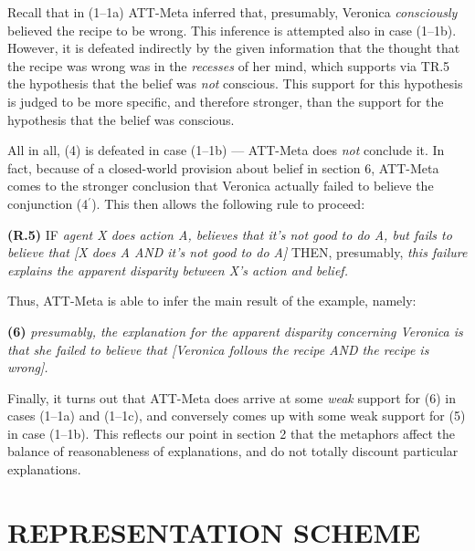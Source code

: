 Recall that in (1--1a) ATT-Meta inferred that, presumably, Veronica {\it
consciously} believed the recipe to be wrong. This inference is attempted also
in case (1--1b).  However, it is defeated indirectly by the given information
that the thought that the recipe was wrong was in the {\it recesses} of her
mind, which supports via TR.5 the hypothesis that the belief was {\it not}
conscious.  This support for this hypothesis is judged to be more specific, and
therefore stronger, than the support for the hypothesis that the belief was
conscious.

All in all, (4) is defeated in case (1--1b) --- ATT-Meta does {\it not}
conclude it.  In fact, because of a closed-world provision about belief in
section 6, ATT-Meta comes to the stronger conclusion that Veronica actually
failed to believe the conjunction (4$^\prime$).  This then allows the following
rule to proceed:

\addtolength{\baselineskip}{-.375\baselineskip}

{\bf (R.5)} IF {\it agent X does action A, believes that it's not 
good to do A, but fails to believe that [X does A AND it's not 
good to do A]} THEN, presumably, {\it this failure explains the apparent disparity
between X's action and belief.}

Thus, ATT-Meta is able to infer the main result of the example, namely:

{\bf (6)} {\it presumably, the explanation for the apparent disparity
concerning Veronica is that she failed to believe that [Veronica follows the
recipe AND the recipe is wrong].}

\addtolength{\baselineskip}{+.6\baselineskip}

Finally, it turns out that ATT-Meta does arrive at some {\it weak} support for (6)
in cases (1--1a) and (1--1c), and conversely comes up with some weak support for (5)
in case (1--1b). This reflects our point in section 2 that the metaphors affect
the balance of reasonableness of explanations, and do not totally discount
particular explanations.





\section{REPRESENTATION SCHEME} %

